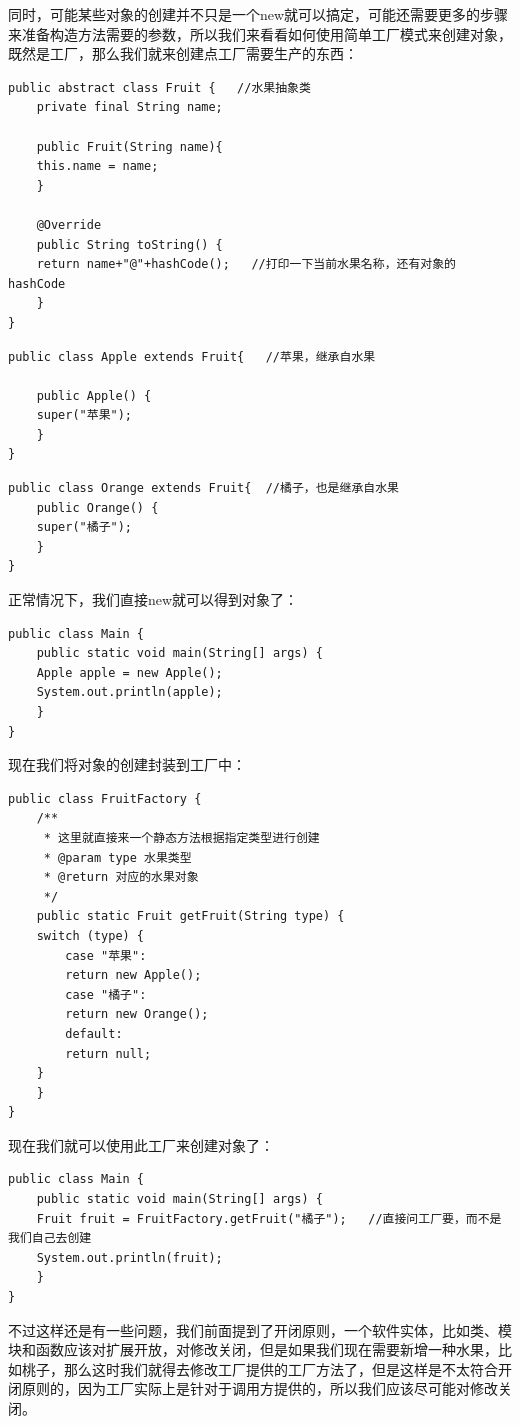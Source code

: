 \documentclass[11pt]{article}
\begin{document}
同时，可能某些对象的创建并不只是一个new就可以搞定，可能还需要更多的步骤来准备构造方法需要的参数，所以我们来看看如何使用简单工厂模式来创建对象，既然是工厂，那么我们就来创建点工厂需要生产的东西：
\begin{verbatim}
public abstract class Fruit {   //水果抽象类
    private final String name;

    public Fruit(String name){
	this.name = name;
    }

    @Override
    public String toString() {
	return name+"@"+hashCode();   //打印一下当前水果名称，还有对象的hashCode
    }
}
\end{verbatim}
\begin{verbatim}
public class Apple extends Fruit{   //苹果，继承自水果

    public Apple() {
	super("苹果");
    }
}
\end{verbatim}
\begin{verbatim}
public class Orange extends Fruit{  //橘子，也是继承自水果
    public Orange() {
	super("橘子");
    }
}
\end{verbatim}
正常情况下，我们直接new就可以得到对象了：
\begin{verbatim}
public class Main {
    public static void main(String[] args) {
	Apple apple = new Apple();
	System.out.println(apple);
    }
}
\end{verbatim}

现在我们将对象的创建封装到工厂中：
\begin{verbatim}
public class FruitFactory {
    /**
     * 这里就直接来一个静态方法根据指定类型进行创建
     * @param type 水果类型
     * @return 对应的水果对象
     */
    public static Fruit getFruit(String type) {
	switch (type) {
	    case "苹果":
		return new Apple();
		case "橘子":
		return new Orange();
	    default:
		return null;
	}
    }
}
\end{verbatim}

现在我们就可以使用此工厂来创建对象了：
\begin{verbatim}
public class Main {
    public static void main(String[] args) {
	Fruit fruit = FruitFactory.getFruit("橘子");   //直接问工厂要，而不是我们自己去创建
	System.out.println(fruit);
    }
}
\end{verbatim}
不过这样还是有一些问题，我们前面提到了开闭原则，一个软件实体，比如类、模块和函数应该对扩展开放，对修改关闭，但是如果我们现在需要新增一种水果，比如桃子，那么这时我们就得去修改工厂提供的工厂方法了，但是这样是不太符合开闭原则的，因为工厂实际上是针对于调用方提供的，所以我们应该尽可能对修改关闭。
\end{document}
